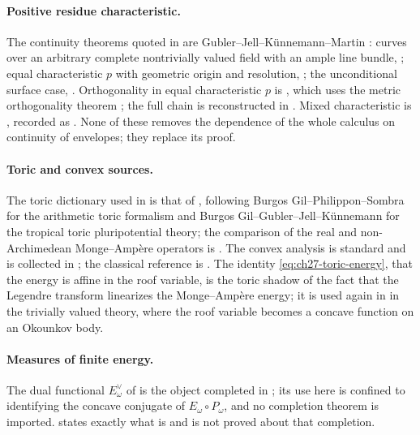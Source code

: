 \paragraph{Positive residue characteristic.}
The continuity theorems quoted in 
are Gubler--Jell--K\"unnemann--Martin \cite{GJKM19}: curves over an
arbitrary complete nontrivially valued field with an ample line bundle,
\cite[Theorem~1.1]{GJKM19}; equal characteristic $p$ with geometric origin and
resolution, \cite[Theorem~8.2]{GJKM19}; the unconditional surface case,
\cite[Corollary~8.3]{GJKM19}.  Orthogonality in equal characteristic $p$
is \cite[Theorem~9.2]{GJKM19}, which uses the metric orthogonality theorem
\cite[Theorem~6.3.2]{BGGJKM20}; the full chain is reconstructed in
.  Mixed characteristic is
\cite{FGK25}, recorded as
.  None of these removes the
dependence of the whole calculus on continuity of envelopes; they replace
its proof.

\paragraph{Toric and convex sources.}
The toric dictionary used in  is that of
, following Burgos Gil--Philippon--Sombra
\cite{BGPS14} for the arithmetic toric formalism and Burgos
Gil--Gubler--Jell--K\"unnemann \cite{BGJKK25} for the tropical toric
pluripotential theory; the comparison of the real and non-Archimedean
Monge--Amp\`ere operators is \cite{Vil20}.  The convex analysis is standard
and is collected in ; the classical reference is
\cite{Roc70}.  The identity \eqref{eq:ch27-toric-energy}, that the energy is
affine in the roof variable, is the toric shadow of the fact that the
Legendre transform linearizes the Monge--Amp\`ere energy; it is used again
in  in the trivially valued theory, where the roof
variable becomes a concave function on an Okounkov body.

\paragraph{Measures of finite energy.}
The dual functional $E^\vee_\omega$ of
 is the object completed in
\cite{BJ25FiniteEnergy}; its use here is confined to identifying the
concave conjugate of $E_\omega\circ P_\omega$, and no completion theorem
is imported.   states exactly what is
and is not proved about that completion.

